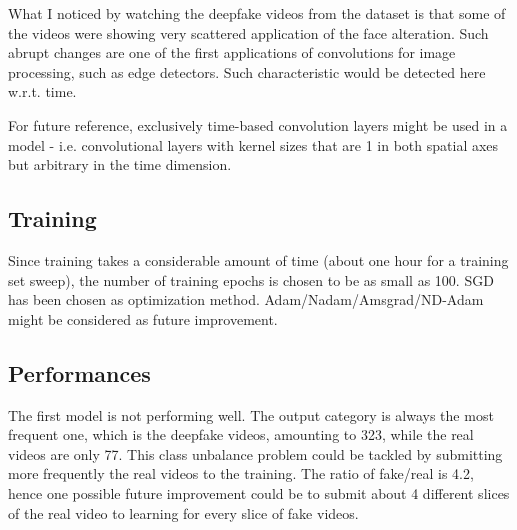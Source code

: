 \documentclass{article}
\begin{document}
What I noticed by watching the deepfake videos from the dataset is that some
of the videos were showing very scattered application of the face alteration.
Such abrupt changes are one of the first applications of convolutions for
image processing, such as edge detectors. Such characteristic would be 
detected here w.r.t. time.

For future reference, exclusively time-based convolution layers might be used
in a model - i.e. convolutional layers with kernel sizes that are 1 in both spatial
axes but arbitrary in the time dimension.

\subsection{Training}

Since training takes a considerable amount of time (about one hour for a training set
sweep), the number of training epochs is chosen to be as small as 100.
SGD has been chosen as optimization method. Adam/Nadam/Amsgrad/ND-Adam might be considered
as future improvement.

\subsection{Performances}
The first model is not performing well. The output category is always the most frequent 
one, which is the deepfake videos, amounting to 323, while the real videos are only 77.
This class unbalance problem could be tackled by submitting more frequently
the real videos to the training. The ratio of fake/real is 4.2, hence one possible
future improvement could be to submit about 4 different slices of the real video to 
learning for every slice of fake videos.
\end{document}
